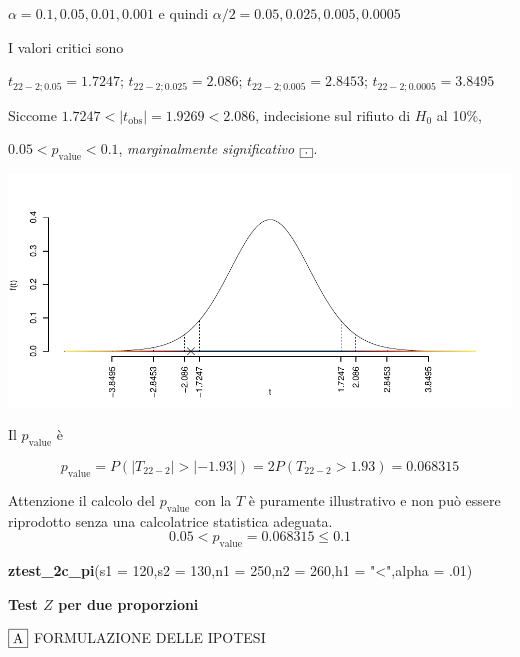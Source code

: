 \documentclass[
  11pt,
]{book}
\newenvironment{Shaded}{\begin{snugshade}}{\end{snugshade}}
\newcommand{\AttributeTok}[1]{\textcolor[rgb]{0.13,0.29,0.53}{#1}}
\newcommand{\DecValTok}[1]{\textcolor[rgb]{0.00,0.00,0.81}{#1}}
\newcommand{\FunctionTok}[1]{\textcolor[rgb]{0.13,0.29,0.53}{\textbf{#1}}}
\newcommand{\NormalTok}[1]{#1}
\newcommand{\StringTok}[1]{\textcolor[rgb]{0.31,0.60,0.02}{#1}}
\theoremstyle{mytheoremstyle}
\theoremstyle{mydefstyle}
\begin{document}
\(\alpha=0.1, 0.05, 0.01, 0.001\) e quindi \(\alpha/2=0.05, 0.025, 0.005, 0.0005\)

I valori critici sono

\(t_{22-2;0.05}=1.7247\); \(t_{22-2;0.025}=2.086\); \(t_{22-2;0.005}=2.8453\); \(t_{22-2;0.0005}=3.8495\)

Siccome \(1.7247<|t_\text{obs}|=1.9269<2.086\), indecisione sul rifiuto di \(H_0\) al 10\%,

\(0.05<p_\text{value}<0.1\), \emph{marginalmente significativo} \(\fbox{.}\).

\begin{center}\includegraphics{Appunti_di_Statistica_2025_files/figure-latex/25-test-functions-10-12} \end{center}

Il \(p_{\text{value}}\) è

\[ p_{\text{value}} = P(|T_{22-2}|>|-1.93|)=2P(T_{22-2}>1.93)=0.068315 \]

Attenzione il calcolo del \(p_\text{value}\) con la \(T\) è puramente illustrativo e non può essere riprodotto senza una calcolatrice statistica adeguata.\[
 0.05 < p_\text{value}= 0.068315 \leq 0.1 
\]

\begin{Shaded}
\begin{Highlighting}[]
\FunctionTok{ztest\_2c\_pi}\NormalTok{(}\AttributeTok{s1 =} \DecValTok{120}\NormalTok{,}\AttributeTok{s2 =} \DecValTok{130}\NormalTok{,}\AttributeTok{n1 =} \DecValTok{250}\NormalTok{,}\AttributeTok{n2 =} \DecValTok{260}\NormalTok{,}\AttributeTok{h1 =} \StringTok{"\textless{}"}\NormalTok{,}\AttributeTok{alpha =}\NormalTok{ .}\DecValTok{01}\NormalTok{)}
\end{Highlighting}
\end{Shaded}

\textbf{Test \(Z\) per due proporzioni}

\(\fbox{A}\) FORMULAZIONE DELLE IPOTESI
\end{document}
